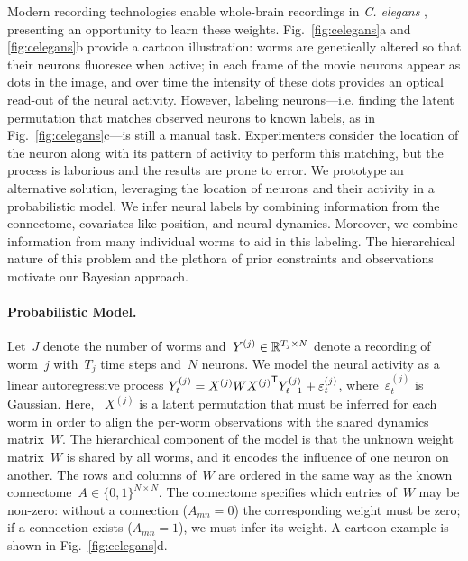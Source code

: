 \documentclass[twoside]{article}
\begin{document}


Modern recording technologies enable whole-brain recordings in
\textit{C. elegans} \citep{nguyen2016whole}, presenting an opportunity
to learn these weights.
Fig.~\ref{fig:celegans}a and \ref{fig:celegans}b provide a cartoon illustration:
worms are genetically altered so that their neurons fluoresce when
active; in each frame of the movie neurons appear as dots in the image,
and over time the intensity of these dots provides an optical read-out
of the neural activity. 
However, labeling neurons---i.e. finding the latent permutation that matches
observed neurons to known labels, as in Fig.~\ref{fig:celegans}c---is still a manual task.  Experimenters
consider the location of the neuron along with its pattern of activity
to perform this matching, but the process is laborious and the results
are prone to error. We prototype an alternative solution, leveraging the
location of neurons and their activity in a probabilistic model. We
infer neural labels by combining 
information from the connectome, covariates like position, and
neural dynamics. Moreover, we combine information from many
individual worms to aid in this labeling.  The hierarchical
nature of this problem and the plethora of prior constraints and
observations motivate our Bayesian approach.

\paragraph{Probabilistic Model.}
Let~$J$ denote the number of worms
and~${Y^{(j)} \in \mathbb{R}^{T_j \times N}}$ denote a recording of
worm~$j$ with~$T_j$ time steps and~$N$ neurons.  We model the neural
activity as a linear autoregressive process
${Y^{(j)}_t = {X^{(j)}} W {X^{(j)}}^{\mathsf{T}}
  Y^{(j)}_{t-1}+\varepsilon^{(j)}_t}$, where~$\varepsilon_t^{(j)}$ is
Gaussian.  Here, ~$X^{(j)}$ is a latent permutation that must be
inferred for each worm in order to align the per-worm observations
with the shared dynamics matrix~$W$.  The hierarchical component of
the model is that the unknown weight matrix~$W$ is shared by all
worms, and it encodes the influence of one neuron on another. The rows
and columns of~$W$ are ordered in the same way as the known
connectome~$A \in \{0,1\}^{N \times N}$. The connectome specifies which entries of~$W$ may be
non-zero: without a connection (${A_{mn}=0}$) the corresponding weight
must be zero; if a connection exists (${A_{mn}=1}$), we must infer its
weight. A cartoon example is shown in Fig.~\ref{fig:celegans}d.
\end{document}
